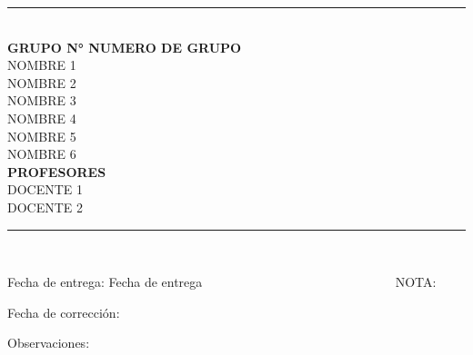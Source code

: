 \begin{titlepage}
\begin{center}
        \vspace{-0.3cm}
        \normalsize
        \rule{10cm}{0.01cm}\\
        \vspace{0.4cm}
        \textbf{GRUPO N° NUMERO DE GRUPO}\\ %
        \vspace{0.15cm}
        NOMBRE 1\\ %
        \vspace{0.1cm}
        NOMBRE 2\\ %
        \vspace{0.1cm}
        NOMBRE 3\\ %
        \vspace{0.1cm}
        NOMBRE 4\\ %
        \vspace{0.1cm}
        NOMBRE 5\\ %
        \vspace{0.1cm}
        NOMBRE 6\\ %
        \vspace{0.15cm}
        \textbf{PROFESORES}\\
        \vspace{0.15cm}
        DOCENTE 1\\ %
        \vspace{0.1cm}
        DOCENTE 2\\ %
        \vspace{0.15cm}
        \rule{10cm}{0.01cm}\\
        
        
\end{center}
    \noindent
    \hspace{30pt}Fecha de entrega: Fecha de entrega ~~~~~~~~~~~~~~~~~~~~~~~~~~~~~ NOTA:
    
    \noindent
    \hspace{30pt}Fecha de corrección:
    
    \noindent
    \hspace{30pt}Observaciones: 
        
    
\end{titlepage}